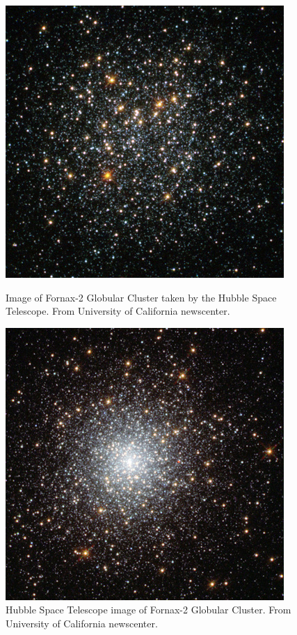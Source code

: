 \begin{figure}[H]
  \centering
  \begin{minipage}[b]{0.49\textwidth}
    \includegraphics[width=\textwidth]{images/fornax-2-400.jpg}
    \caption[Hubble image of Fornax-2 Globular Cluster]{Image of Fornax-2 Globular Cluster taken by the Hubble Space Telescope. From University of California newscenter.}
  \end{minipage}
  \hfill
  \begin{minipage}[b]{0.49\textwidth}
    \includegraphics[width=\textwidth]{images/fornax-3-400.jpg}
    \caption[Hubble Space Telescope image of Fornax-3 Globular Cluster]{Hubble Space Telescope image of Fornax-2 Globular Cluster. From University of California newscenter.}
  \end{minipage}
\end{figure}

